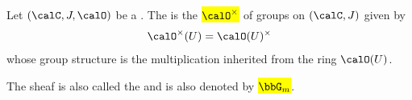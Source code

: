 \begin{definition} \label{definition:multiplicative_group_sheaf_of_a_ringed_site}
    Let $(\calC, J, \calO)$ be a . 
    The  is the  \hl{$\calO^\times$} of groups on $(\calC, J)$ given by 
    $$\calO^\times(U) = \calO(U)^\times$$
     whose group structure is the multiplication inherited from the ring $\calO(U)$. 

    The sheaf is also called the  and is also denoted by \hl{$\bbG_m$}.
\end{definition}